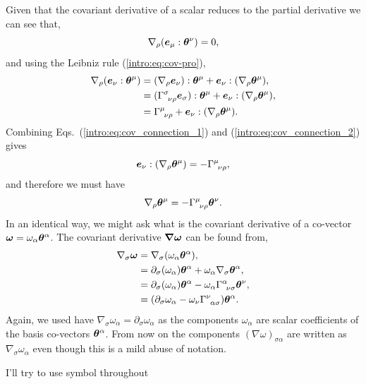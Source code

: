 Given that the covariant derivative of a scalar reduces to the partial derivative we can see that, 
\begin{equation}
\nabla_\rho (\boldsymbol{e}_\mu : \boldsymbol{\theta}^\nu) = 0,\label{intro:eq:cov_connection_1}
\end{equation}
and using the Leibniz rule (\ref{intro:eq:cov-pro}), 
\begin{align}
\nabla_\rho (\boldsymbol{e}_\nu : \boldsymbol{\theta}^\mu) &= (\nabla_\rho \boldsymbol{e}_\nu):\boldsymbol{\theta}^\mu + \boldsymbol{e}_\nu:(\nabla_\rho \boldsymbol{\theta}^\mu),\\
 &= (\Gamma^\sigma_{\,\,\,\nu\rho}\boldsymbol{e}_\sigma):\boldsymbol{\theta}^\mu + \boldsymbol{e}_\nu:(\nabla_\rho \boldsymbol{\theta}^\mu),\\
  &= \Gamma^\mu_{\,\,\,\nu\rho} + \boldsymbol{e}_\nu:(\nabla_\rho \boldsymbol{\theta}^\mu). \label{intro:eq:cov_connection_2}
\end{align}
Combining Eqs.~(\ref{intro:eq:cov_connection_1}) and (\ref{intro:eq:cov_connection_2}) gives
\begin{equation}
  \boldsymbol{e}_\nu:(\nabla_\rho \boldsymbol{\theta}^\mu) = -\Gamma^\mu_{\,\,\,\nu\rho},
\end{equation}
and therefore we must have
\begin{equation}
\nabla_\rho \boldsymbol{\theta}^\mu = -\Gamma^\mu_{\,\,\,\nu\rho} \boldsymbol{\theta}^\nu.
\end{equation}
In an identical way, we might ask what is the covariant derivative of a co-vector $\boldsymbol{\omega}=\omega_\alpha \boldsymbol{\theta}^\alpha$. The covariant derivative $\boldsymbol{\nabla \omega}$ can be found from,
\begin{align}
\nabla_\sigma \boldsymbol {\omega} &= \nabla_\sigma(\omega_\alpha \boldsymbol{\theta}^\alpha),\\
&= \partial_\sigma(\omega_\alpha) \boldsymbol{\theta}^\alpha + \omega_\alpha  \nabla_\sigma \boldsymbol{\theta}^\alpha,\\
&= \partial_\sigma(\omega_\alpha) \boldsymbol{\theta}^\alpha - \omega_\alpha \Gamma^\alpha_{\,\,\,\nu\sigma} \boldsymbol\theta^\nu ,\\
&= (\partial_\sigma\omega_\alpha  - \omega_\nu \Gamma^\nu_{\,\,\,\alpha\sigma} )\boldsymbol\theta^\alpha .
\end{align}
Again, we used have $\nabla_\sigma \omega_\alpha = \partial_\sigma \omega_\alpha$ as the components $\omega_\alpha$ are scalar coefficients of the basis co-vectors $\boldsymbol{\theta}^\alpha$. From now on the components $(\nabla \omega)_{\sigma\alpha} $ are written as $ \nabla_\sigma \omega_\alpha$ even though this is a mild abuse of notation.

\color{choral} I'll try to use symbol throughout \color{black}

